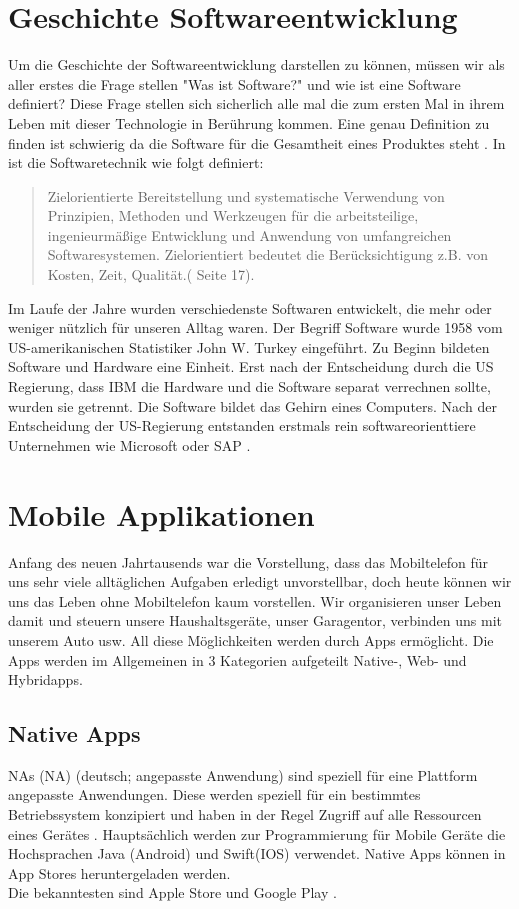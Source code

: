 \section{Geschichte Softwareentwicklung}
Um die Geschichte der Softwareentwicklung darstellen zu können, müssen wir als aller erstes die Frage stellen "Was ist Software?" und wie ist eine Software definiert?
Diese Frage stellen sich sicherlich alle mal die zum ersten Mal in ihrem Leben mit dieser Technologie in Berührung kommen. Eine genau Definition zu finden ist schwierig da die Software für die Gesamtheit eines Produktes steht . In \cite{WasistSoftware} ist die Softwaretechnik wie folgt definiert:
\begin{quote}
\glqq Zielorientierte Bereitstellung und systematische Verwendung von Prinzipien, Methoden und Werkzeugen für
die arbeitsteilige, ingenieurmäßige Entwicklung und Anwendung
von umfangreichen Softwaresystemen. Zielorientiert bedeutet die
Berücksichtigung z.B. von Kosten, Zeit, Qualität.\grqq (\cite{WasistSoftware} Seite 17).
\end{quote}
Im Laufe der Jahre wurden verschiedenste Softwaren entwickelt, die mehr oder weniger nützlich für unseren Alltag waren.
Der Begriff Software wurde 1958 vom US-amerikanischen Statistiker John W. Turkey eingeführt.
Zu Beginn bildeten Software und Hardware eine Einheit. Erst nach der Entscheidung durch die US Regierung, dass IBM die Hardware und die Software separat verrechnen sollte, wurden sie getrennt.
Die Software bildet das Gehirn eines Computers. 
Nach der Entscheidung der US-Regierung entstanden erstmals rein softwareorienttiere Unternehmen wie Microsoft oder SAP \cite{Microsoft} \cite{SAP}. 


\section{Mobile Applikationen}
Anfang des neuen Jahrtausends war die Vorstellung, dass das Mobiltelefon für uns sehr viele alltäglichen Aufgaben erledigt unvorstellbar, doch heute können wir uns das Leben ohne 
Mobiltelefon kaum vorstellen.
Wir organisieren unser Leben damit und steuern unsere Haushaltsgeräte, unser Garagentor, verbinden uns mit unserem Auto usw. All diese Möglichkeiten werden durch Apps ermöglicht.
Die Apps werden im Allgemeinen in 3 Kategorien aufgeteilt
Native-, Web- und Hybridapps. 

\subsection{Native Apps}\label{chap:Native Apps}
\acl{NA}s (NA) (deutsch; angepasste Anwendung) sind speziell für eine Plattform angepasste Anwendungen. 
Diese werden speziell für ein bestimmtes Betriebssystem konzipiert und haben in der Regel Zugriff auf alle Ressourcen eines Gerätes \cite{NativeApp}.
Hauptsächlich werden zur Programmierung für Mobile Geräte die Hochsprachen Java (Android) und Swift(IOS) verwendet. Native Apps können in App Stores heruntergeladen  werden. \\Die bekanntesten sind Apple Store und Google Play \cite{Hochsprachen}.

